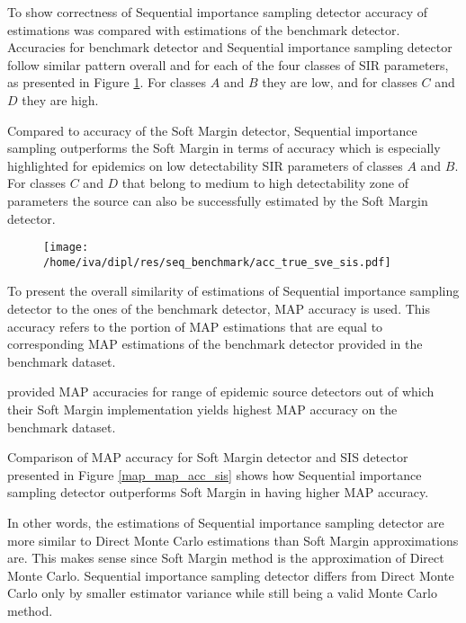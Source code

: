 \documentclass[times, utf8, diplomski]{fer}
\begin{document}
To show correctness of Sequential importance sampling detector accuracy of estimations was compared with estimations of the benchmark detector. 
Accuracies for benchmark detector and Sequential importance sampling detector follow similar pattern overall and for each of the four classes of SIR parameters, as presented in Figure \ref{accuracy_true_sis}. For classes $A$ and $B$ they are low, and for classes  $C$ and $D$ they are high. 

Compared to accuracy of the Soft Margin detector, Sequential importance sampling outperforms the Soft Margin in terms of accuracy which is especially  highlighted for epidemics on low detectability SIR parameters of classes $A$ and $B$. For classes $C$ and $D$ that belong to medium to high detectability zone of parameters the source can also be successfully estimated by the Soft Margin detector.

\begin{figure}[H]
\begin{minipage}{\linewidth}
\center
\texttt{[image: /home/iva/dipl/res/seq\_benchmark/acc\_true\_sve\_sis.pdf]}
\label{accuracy_true_sis}
\end{minipage}
\end{figure}

To present the overall similarity of estimations of Sequential importance sampling detector to the ones of the benchmark detector, MAP accuracy is used. This accuracy refers to the portion of MAP estimations that are equal to corresponding MAP estimations of the benchmark detector provided in the benchmark dataset. 

\citet{Nino} provided MAP accuracies for range of epidemic source detectors out of which their Soft Margin implementation yields highest MAP accuracy on the benchmark dataset. 

Comparison of MAP accuracy for Soft Margin detector and SIS detector presented in Figure \ref{map_map_acc_sis} shows how Sequential importance sampling detector outperforms Soft Margin in having higher MAP accuracy.

In other words, the estimations of Sequential importance sampling detector are  more similar to Direct Monte Carlo estimations than Soft Margin approximations are. This makes sense since Soft Margin method is the approximation of Direct Monte Carlo. Sequential importance sampling detector differs from Direct Monte Carlo only by smaller estimator variance while still being a valid Monte Carlo method.
\end{document}
